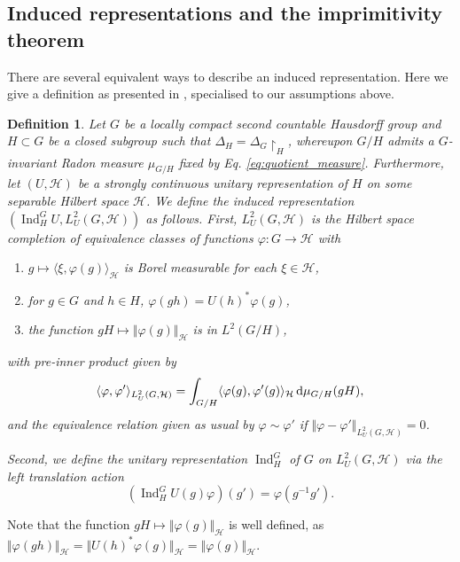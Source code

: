 \documentclass[sn-mathphys-num]{sn-jnl}%
\newcommand{\HH}{\mathcal{H}}
\DeclareMathOperator{\Ind}{Ind}
\newcommand{\diff}{\textup{d}}
\numberwithin{equation}{section}
\theoremstyle{thmstyleone}%
\theoremstyle{thmstyletwo}%
\theoremstyle{thmstylethree}%
\newtheorem{definition}[theorem]{Definition}%
\begin{document}
\subsection{Induced representations and the imprimitivity theorem}\label{appsec:catt}
There are several equivalent ways to describe an induced representation. Here we give a definition as presented in \cite{kaniuth2012induced}, specialised to our assumptions above.
\begin{definition}
    \label{def:induced_rep}
    Let $G$ be a locally compact second countable Hausdorff group and $H\subset G$ be a closed subgroup such that $\Delta_H=\Delta_G\restriction_H$, whereupon $G/H$ admits a $G$-invariant Radon measure $\mu_{G/H}$ fixed by Eq. \eqref{eq:quotient_measure}. Furthermore, let $(U,\HH)$ be a strongly continuous unitary representation of $H$ on some separable Hilbert space $\HH$. We define the \textup{induced representation} $(\Ind_H^G U,L^2_U(G,\HH))$ as follows. First, $L^2_U(G,\HH)$ is the Hilbert space completion of equivalence classes of functions $\varphi:G\to \HH$ with
    \begin{enumerate}
        \item $g\mapsto\langle\xi,\varphi(g)\rangle_\HH$ is Borel measurable for each $\xi\in \HH$,
        \item for $g\in G$ and $h\in H$, $\varphi(gh)=U(h)^*\varphi(g)$,
        \item the function $gH\mapsto \Vert\varphi(g)\Vert_\HH$ is in $L^2(G/H)$,
    \end{enumerate}
    with pre-inner product given by 
    \begin{equation}
    \label{eq:induced_prod}
        \langle \varphi,\varphi'\rangle_{L^2_U(G,\HH)}=\int_{G/H}\langle \varphi(g),\varphi'(g)\rangle_\HH\,\diff\mu_{G/H}(gH),
    \end{equation}
    and the equivalence relation given as usual by $\varphi\sim\varphi'$ if $\Vert\varphi-\varphi'\Vert_{L^2_U(G,\HH)}=0$. 
    
    Second, we define the unitary representation $\Ind_H^G$ of $G$ on $L^2_U(G,\HH)$ via the left translation action
    \begin{equation}
        (\Ind_H^G U(g)\varphi)(g')=\varphi(g^{-1}g').
    \end{equation}
    \end{definition}
    Note that the function $gH\mapsto \Vert\varphi(g)\Vert_\HH$ is well defined, as $\Vert\varphi(gh)\Vert_\HH=\Vert U(h)^*\varphi(g)\Vert_\HH=\Vert \varphi(g)\Vert_\HH$. 
    
\end{document}
